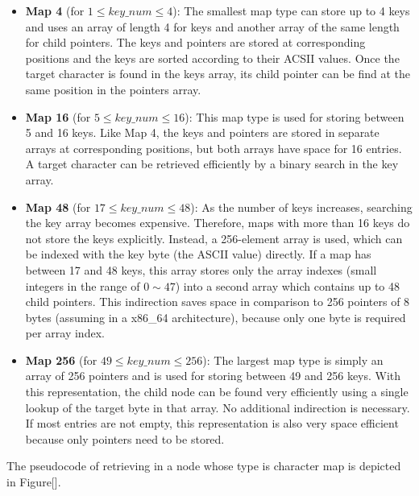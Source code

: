 \documentclass[legalpaper]{article}
\begin{document}
\begin{itemize}
\item \textbf{Map 4} (for $1 \le key\_num \le 4$): The smallest map
type can store up to 4 keys and uses an array of length 4 for keys and
another array of the same length for child pointers. The keys and
pointers are stored at corresponding positions and the keys are sorted
according to their ACSII values. Once the target character is found in
the keys array, its child pointer can be find at the same position in
the pointers array.

\item \textbf{Map 16} (for $5 \le key\_num \le 16$): This map type is
used for storing between 5 and 16 keys. Like Map 4, the keys and
pointers are stored in separate arrays at corresponding positions, but
both arrays have space for 16 entries. A target character can be
retrieved efficiently by a binary search in the key array.

\item \textbf{Map 48} (for $17 \le key\_num \le 48$): As the number of
keys increases, searching the key array becomes expensive. Therefore,
maps with more than 16 keys do not store the keys explicitly. Instead,
a 256-element array is used, which can be indexed with the key byte
(the ASCII value) directly. If a map has between 17 and 48 keys, this
array stores only the \textsf{array indexes} (small integers in the
range of $0 \sim 47$) into a second array which contains up to 48
child pointers. This indirection saves space in comparison to 256
pointers of 8 bytes (assuming in a x86\_64 architecture), because only
one byte is required per array index.

\item \textbf{Map 256} (for $49 \le key\_num \le 256$): The largest
map type is simply an array of 256 pointers and is used for storing
between 49 and 256 keys.  With this representation, the child node can
be found very efficiently using a single lookup of the target byte in
that array.  No additional indirection is necessary. If most entries
are not empty, this representation is also very space efficient
because only pointers need to be stored.

\end{itemize}

The pseudocode of retrieving in a node whose type is character map is
depicted in Figure[].
\end{document}
